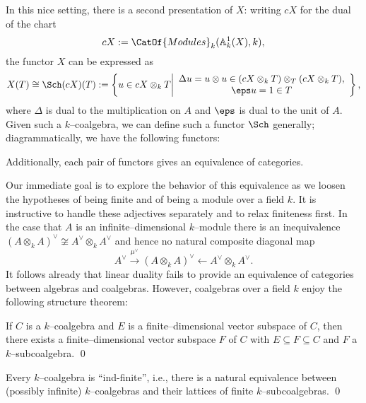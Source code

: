 In this nice setting, there is a second presentation of $X$: writing $cX$ for the dual of the chart \[cX := \CatOf{Modules}_k(\mathbb A^1_k(X), k),\] the functor $X$ can be expressed as \[X(T) \cong \Sch(cX)(T) := \left\{u \in cX \otimes_k T \middle| \begin{array}{c} \Delta u = u \otimes u \in (cX \otimes_k T) \otimes_T (cX \otimes_k T), \\ \eps u = 1 \in T \end{array}\right\},\] where $\Delta$ is dual to the multiplication on $A$ and $\eps$ is dual to the unit of $A$.  Given such a $k$--coalgebra, we can define such a functor $\Sch$ generally; diagrammatically, we have the following functors:
\begin{center}
\end{center}
Additionally, each pair of functors gives an equivalence of categories.

Our immediate goal is to explore the behavior of this equivalence as we loosen the hypotheses of being finite and of being a module over a field $k$.  It is instructive to handle these adjectives separately and to relax finiteness first.  In the case that $A$ is an infinite--dimensional $k$--module there is an inequivalence $(A \otimes_k A)^\vee \not\cong A^\vee \otimes_k A^\vee$ and hence no natural composite diagonal map \[A^\vee \xrightarrow{\mu^\vee} (A \otimes_k A)^\vee \leftarrow A^\vee \otimes_k A^\vee.\] It follows already that linear duality fails to provide an equivalence of categories between algebras and coalgebras.  However, coalgebras over a field $k$ enjoy the following structure theorem:
\begin{lemma}
If $C$ is a $k$--coalgebra and $E$ is a finite--dimensional vector subspace of $C$, then there exists a finite--dimensional vector subspace $F$ of $C$ with $E \subseteq F \subseteq C$ and $F$ a $k$--subcoalgebra. \qed
\end{lemma}

\begin{corollary}
Every $k$--coalgebra is ``ind-finite'', i.e., there is a natural equivalence between (possibly infinite) $k$--coalgebras and their lattices of finite $k$--subcoalgebras. \qed
\end{corollary}

